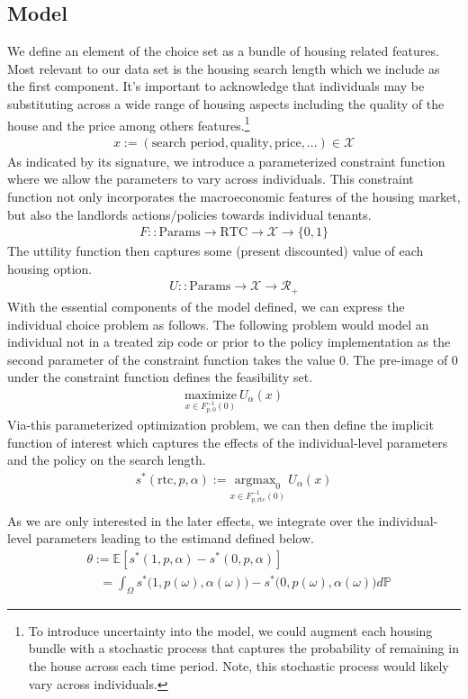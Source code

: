 \documentclass[a4paper,12pt]{article}
\begin{document}
\subsection{Model}
We define an element of the choice set as a bundle of housing related features. Most relevant to our data set is the housing search length which we include as the first component. It's important to acknowledge that individuals may be substituting across a wide range of housing aspects including the quality of the house and the price among others features.\footnote{To introduce uncertainty into the model, we could augment each housing bundle with a stochastic process that captures the probability of remaining in the house across each time period. Note, this stochastic process would likely vary across individuals.}
\begin{align*}
    x := (\textrm{search period}, \textrm{quality}, \textrm{price}, \dots ) \in \mathcal{X}
\end{align*}
As indicated by its signature, we introduce a parameterized constraint function where we allow the parameters to vary across individuals. This constraint function not only incorporates the macroeconomic features of the housing market, but also the landlords actions/policies towards individual tenants.
\begin{align*}
   F :: \textrm{Params} \to  \textrm{RTC} \to \mathcal{X} \to \{0, 1\} 
\end{align*}
The uttility function then captures some (present discounted) value of each housing option. 
\begin{align*}
U :: \textrm{Params} \to \mathcal{X} \to \mathcal{R}_+ 
\end{align*}
With the essential components of the model defined, we can express the individual choice problem as follows. The following problem would model an individual not in a treated zip code or prior to the policy implementation as the second parameter of the constraint function takes the value $0$. The pre-image of $0$ under the constraint function defines the feasibility set. 
\begin{align*}
\underset{x \in F_{p, 0}^{-1}(0)}{\textrm{maximize}} \ U_{\alpha} (x)
\end{align*}
Via-this parameterized optimization problem, we can then define the implicit function of interest which captures the effects of the individual-level parameters and the policy on the search length. 
\begin{align*}
s^*(\textrm{rtc}, p, \alpha) := \underset{x \in F_{p, \textrm{rtc}}^{-1}(0)}{\textrm{argmax}_0} \ U_{\alpha} (x) \\ 
\end{align*}
As we are only interested in the later effects, we integrate over the individual-level parameters leading to the estimand defined below.
\begin{align*}
&\theta := \mathbb{E}[s^*(1, p, \alpha) - s^*(0,  p, \alpha)] \\
&\quad = \int _{\Omega} s^*\big(1, p(\omega), \alpha(\omega)\big) - s^*\big(0, p(\omega), \alpha(\omega)\big)d\mathbb{P}
\end{align*}
\end{document}
